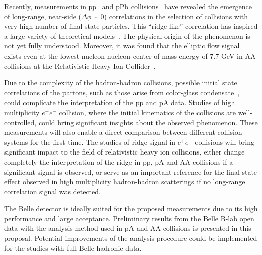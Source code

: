 Recently, measurements in pp~\cite{Khachatryan:2010gv} and pPb collisions~\cite{CMS:2012qk,Abelev:2012ola,Aad:2012gla} have revealed the emergence of long-range, near-side ($\Delta\phi\sim 0$) correlations in the selection of collisions with very high number of final state particles. This ``ridge-like'' correlation has inspired a large variety of theoretical models~\cite{Bzdak:2013zma,Dusling:2015gta}. The physical origin of the phenomenon is not yet fully understood. Moreover, it was found that the elliptic flow signal exists even at the lowest nucleon-nucleon center-of-mass energy of 7.7 GeV in AA collisions at the Relativistic Heavy Ion Collider~\cite{Adamczyk:2012ku}. 

Due to the complexity of the hadron-hadron collisions, possible initial state correlations of the partons, such as those arise from color-glass condensate~\cite{Gelis:2010nm, Dusling:2013qoz}, could complicate the interpretation of the pp and pA data. Studies of high multiplicity $e^+e^-$ collision, where the initial kinematics of the collisions are well-controlled, could bring significant insights about the observed phenomenon. These measurements will also enable a direct comparison between different collision systems for the first time. The studies of ridge signal in $e^+e^-$ collisions will bring significant impact to the field of relativistic heavy ion collisions, either change completely the interpretation of the ridge in pp, pA and AA collisions if a significant signal is observed, or serve as an important reference for the final state effect observed in high multiplicity hadron-hadron scatterings if no long-range correlation signal was detected. 

The Belle detector is ideally suited for the proposed measurements due to its high performance and large acceptance. Preliminary results from the Belle B-lab open data with the analysis method used in pA and AA collisions is presented in this proposal. Potential improvements of the analysis procedure could be implemented for the studies with full Belle hadronic data.
